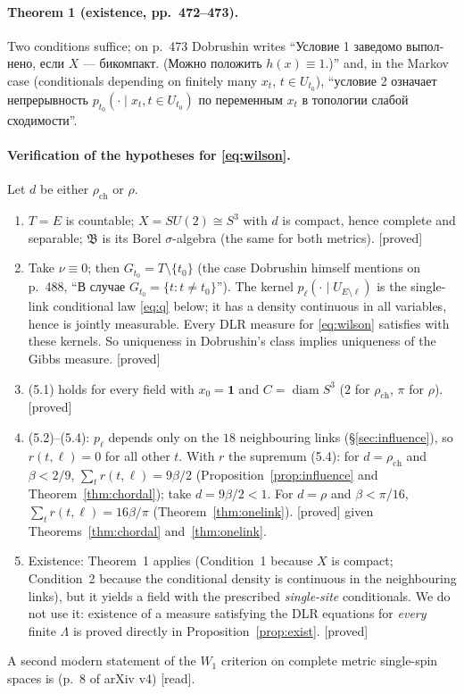 \documentclass[11pt,a4paper]{article}
\theoremstyle{remark}
\theoremstyle{definition}
\newcommand{\st}[1]{\textsf{[#1]}}
\newcommand{\ru}[1]{\foreignlanguage{russian}{#1}}
\newcommand{\rch}{\rho_{\mathrm{ch}}}
\begin{document}
\paragraph{Theorem 1 (existence, pp.~472--473).} Two conditions suffice; on p.~473 Dobrushin writes
``\ru{Условие 1 заведомо выполнено, если $X$ --- бикомпакт. (Можно положить $h(x)\equiv1$.)}'' and, in the
Markov case (conditionals depending on finitely many $x_t$, $t\in U_{t_0}$), ``\ru{условие 2 означает
непрерывность $p_{t_0}(\cdot\mid x_t, t\in U_{t_0})$ по переменным $x_t$ в топологии слабой
сходимости}''.

\paragraph{Verification of the hypotheses for \eqref{eq:wilson}.} Let $d$ be either $\rch$ or $\rho$.
\begin{enumerate}
\item $T=E$ is countable; $X=SU(2)\cong S^3$ with $d$ is compact, hence complete and separable;
$\mathfrak B$ is its Borel $\sigma$-algebra (the same for both metrics). \st{proved}
\item Take $\nu\equiv0$; then $G_{t_0}=T\setminus\{t_0\}$ (the case Dobrushin himself mentions on
p.~488, ``\ru{В случае $G_{t_0}=\{t:t\neq t_0\}$}''). The kernel $p_{\ell}(\cdot\mid U_{E\setminus\ell})$ is
the single-link conditional law \eqref{eq:q} below; it has a density continuous in all variables, hence
is jointly measurable. Every DLR measure for \eqref{eq:wilson} satisfies \cite[(1.3)]{Dob70} with these
kernels. So uniqueness in Dobrushin's class implies uniqueness of the Gibbs measure. \st{proved}
\item (5.1) holds for every field with $x_0=\mathbf 1$ and $C=\operatorname{diam}S^3$ ($2$ for $\rch$, $\pi$ for $\rho$). \st{proved}
\item (5.2)--(5.4): $p_\ell$ depends only on the $18$ neighbouring links (\S\ref{sec:influence}), so
$r(t,\ell)=0$ for all other $t$. With $r$ the supremum (5.4): for $d=\rch$ and $\beta<2/9$,
$\sum_t r(t,\ell)=9\beta/2$ (Proposition~\ref{prop:influence} and Theorem~\ref{thm:chordal}); take $d=9\beta/2<1$.
For $d=\rho$ and $\beta<\pi/16$, $\sum_t r(t,\ell)=16\beta/\pi$ (Theorem~\ref{thm:onelink}). \st{proved} given
Theorems~\ref{thm:chordal} and~\ref{thm:onelink}.
\item Existence: Theorem~1 applies (Condition~1 because $X$ is compact; Condition~2 because the
conditional density is continuous in the neighbouring links), but it yields a field with the
prescribed \emph{single-site} conditionals. We do not use it: existence of a measure satisfying the DLR
equations for \emph{every} finite $\Lambda$ is proved directly in Proposition~\ref{prop:exist}. \st{proved}
\end{enumerate}
A second modern statement of the $W_1$ criterion on complete metric single-spin spaces is
\cite[Thm~3.5]{DS25} (p.~8 of arXiv v4) \st{read}.
\end{document}
